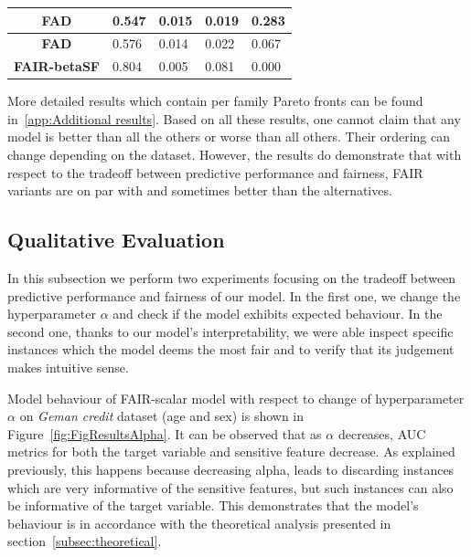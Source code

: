 \documentclass[preprint,12pt]{elsarticle}
\begin{document}
\begin{table}
\begin{tabular}{|c|l|l|l|l|}
		\textbf{FAD}           & 0.547                             & 0.015                             & 0.019                             & 0.283                              \\ \hline
		\textbf{FAD}           & 0.576                             & 0.014                             & 0.022                             & 0.067                              \\ \hline
		\textbf{FAIR-betaSF}   & 0.804                             & 0.005                             & 0.081                             & 0.000                              \\ \hline
	\end{tabular}
	\label{tab:Ger-sex}%
\end{table}

More detailed results which contain per family Pareto fronts can be found in~\ref{app:Additional results}. Based on all these results, one cannot claim that any model is better than all the others or worse than all others. Their ordering can
change depending on the dataset. However, the results do demonstrate that with respect to the tradeoff between predictive performance and fairness, FAIR variants are on par with and sometimes better than the alternatives.


\subsection{Qualitative Evaluation}

In this subsection we perform two experiments focusing on the tradeoff between predictive performance and fairness of our model. In the first one, we change the hyperparameter $\alpha$ and check if the model exhibits expected behaviour. In the second one, thanks to our model's interpretability, we were able inspect specific instances which the model deems the most fair and to verify that its judgement makes intuitive sense.

Model behaviour of FAIR-scalar model with respect to change of hyperparameter $\alpha$ on \textit{Geman credit} dataset (age and sex) is shown in Figure~\ref{fig:FigResultsAlpha}. It can be observed that as $\alpha$ decreases, AUC metrics for both the target variable and sensitive feature decrease. As explained previously, this happens because decreasing alpha, leads to discarding instances which are very informative of the sensitive features, but such instances can also be informative of the target variable. This demonstrates that the model's behaviour is in accordance with the theoretical analysis presented in section~\ref{subsec:theoretical}.
\end{document}
